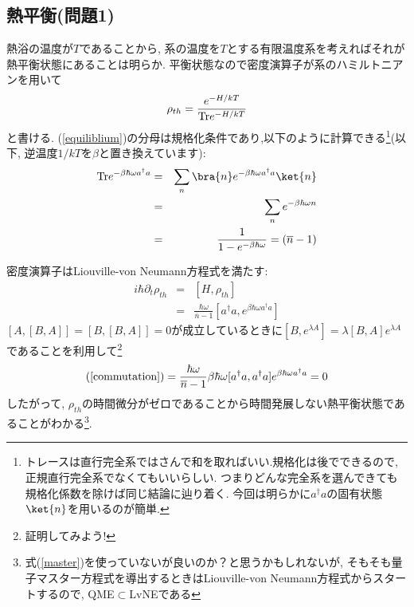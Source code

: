 \documentclass[10.5pt,a4paper]{jreport}
\begin{document}
\subsection{熱平衡(問題1)}
熱浴の温度が$T$であることから, 系の温度を$T$とする有限温度系を考えればそれが熱平衡状態にあることは明らか. 平衡状態なので密度演算子が系のハミルトニアンを用いて
\begin{eqnarray}
  \rho_{th} = \frac{e^{-H/kT}}{{\rm Tr}e^{-H/kT}}\label{equiliblium}
\end{eqnarray}
と書ける. (\ref{equiliblium})の分母は規格化条件であり,以下のように計算できる\footnote{トレースは直行完全系ではさんで和を取ればいい.規格化は後でできるので, 正規直行完全系でなくてもいいらしい. つまりどんな完全系を選んできても規格化係数を除けば同じ結論に辿り着く. 今回は明らかに$a^\dagger a$の固有状態$\ket{n}$を用いるのが簡単. }(以下, 逆温度$1/kT$を$\beta$と置き換えています):
\begin{eqnarray}
  \nonumber  {\rm Tr}e^{-\beta\hbar\omega a^\dagger a} &=& \sum_{n}\bra{n}e^{-\beta\hbar\omega a^\dagger a}\ket{n}\\
  \nonumber  &=& \sum_{n}e^{-\beta\hbar\omega n}\\
  &=& \frac{1}{1-e^{-\beta\hbar\omega}} = (\overline{n} -1)
\end{eqnarray}

密度演算子はLiouville-von Neumann方程式を満たす:
\begin{eqnarray}
  i\hbar\partial_t\rho_{th} &=& [H, \rho_{th}]\\
  &=& \frac{\hbar\omega}{\overline{n}-1}[a^\dagger a, e^{\beta\hbar\omega a^\dagger a}]\label{commutation}
\end{eqnarray}
$[A, [B, A]] = [B, [B, A]] = 0$が成立しているときに$[B, e^{\lambda A}] = \lambda[B, A]e^{\lambda A}$であることを利用して\footnote{証明してみよう!}
\begin{eqnarray}
  (\ref{commutation}) = \frac{\hbar\omega}{\overline{n}-1}\beta\hbar\omega[a^\dagger a, a^\dagger a]e^{\beta\hbar\omega a^\dagger a} = 0
\end{eqnarray}
したがって, $\rho_{th}$の時間微分がゼロであることから時間発展しない熱平衡状態であることがわかる\footnote{式(\ref{master})を使っていないが良いのか？と思うかもしれないが, そもそも量子マスター方程式を導出するときはLiouville-von Neumann方程式からスタートするので, QME$\subset$LvNEである}.
\end{document}
